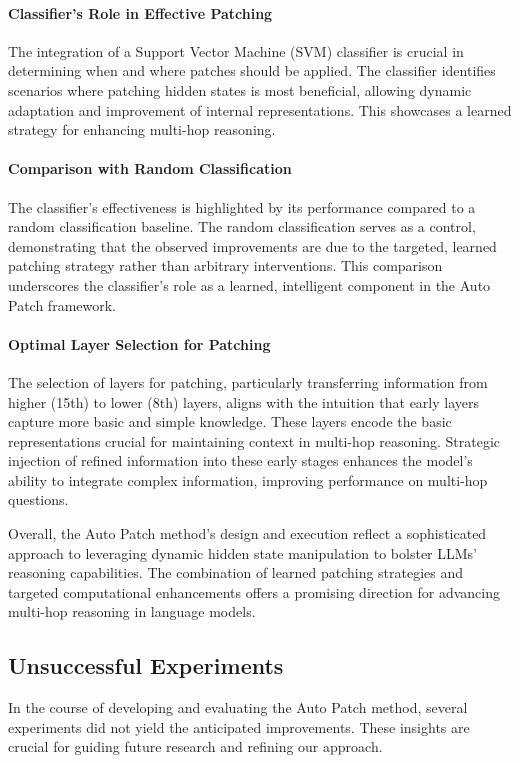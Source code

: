\documentclass[11pt]{article}
\begin{document}
\paragraph{Classifier's Role in Effective Patching} The integration of a Support Vector Machine (SVM) classifier is crucial in determining when and where patches should be applied. The classifier identifies scenarios where patching hidden states is most beneficial, allowing dynamic adaptation and improvement of internal representations. This showcases a learned strategy for enhancing multi-hop reasoning.

\paragraph{Comparison with Random Classification} The classifier’s effectiveness is highlighted by its performance compared to a random classification baseline. The random classification serves as a control, demonstrating that the observed improvements are due to the targeted, learned patching strategy rather than arbitrary interventions. This comparison underscores the classifier's role as a learned, intelligent component in the Auto Patch framework.

\paragraph{Optimal Layer Selection for Patching} The selection of layers for patching, particularly transferring information from higher (15th) to lower (8th) layers, aligns with the intuition that early layers capture more basic and simple knowledge. These layers encode the basic representations crucial for maintaining context in multi-hop reasoning. Strategic injection of refined information into these early stages enhances the model's ability to integrate complex information, improving performance on multi-hop questions.

Overall, the Auto Patch method's design and execution reflect a sophisticated approach to leveraging dynamic hidden state manipulation to bolster LLMs' reasoning capabilities. The combination of learned patching strategies and targeted computational enhancements offers a promising direction for advancing multi-hop reasoning in language models.

\subsection{Unsuccessful Experiments}
In the course of developing and evaluating the Auto Patch method, several experiments did not yield the anticipated improvements. These insights are crucial for guiding future research and refining our approach.
\end{document}
